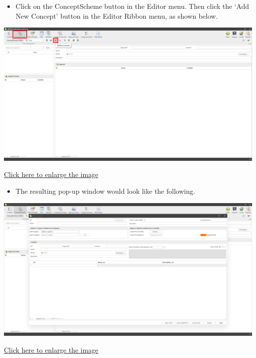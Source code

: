 \documentclass[
]{book}
\providecommand{\tightlist}{%
  \setlength{\itemsep}{0pt}\setlength{\parskip}{0pt}}
\begin{document}
\begin{itemize}
\tightlist
\item
  Click on the ConceptScheme button in the Editor menu. Then click the `Add New Concept' button in the Editor Ribbon menu, as shown below.
\end{itemize}

\begin{center}\includegraphics[width=1\linewidth]{./images/image239} \end{center}

\href{images/image239.png}{Click here to enlarge the image}

\begin{itemize}
\tightlist
\item
  The resulting pop-up window would look like the following.
\end{itemize}

\begin{center}\includegraphics[width=1\linewidth]{./images/image240} \end{center}

\href{images/image240.png}{Click here to enlarge the image}
\end{document}
